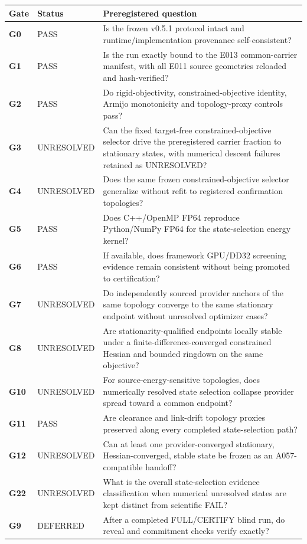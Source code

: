 \documentclass[10pt,a4paper]{article}
\begin{document}
\begin{longtable}{p{13mm}p{24mm}p{119mm}}
\toprule Gate & Status & Preregistered question \\
\midrule\endhead
\textbf{G0} & PASS & Is the frozen v0.5.1 protocol intact and runtime/implementation provenance self-consistent?\\\hline
\textbf{G1} & PASS & Is the run exactly bound to the E013 common-carrier manifest, with all E011 source geometries reloaded and hash-verified?\\\hline
\textbf{G2} & PASS & Do rigid-objectivity, constrained-objective identity, Armijo monotonicity and topology-proxy controls pass?\\\hline
\textbf{G3} & UNRESOLVED & Can the fixed target-free constrained-objective selector drive the preregistered carrier fraction to stationary states, with numerical descent failures retained as UNRESOLVED?\\\hline
\textbf{G4} & UNRESOLVED & Does the same frozen constrained-objective selector generalize without refit to registered confirmation topologies?\\\hline
\textbf{G5} & PASS & Does C++/OpenMP FP64 reproduce Python/NumPy FP64 for the state-selection energy kernel?\\\hline
\textbf{G6} & PASS & If available, does framework GPU/DD32 screening evidence remain consistent without being promoted to certification?\\\hline
\textbf{G7} & UNRESOLVED & Do independently sourced provider anchors of the same topology converge to the same stationary endpoint without unresolved optimizer cases?\\\hline
\textbf{G8} & UNRESOLVED & Are stationarity-qualified endpoints locally stable under a finite-difference-converged constrained Hessian and bounded ringdown on the same objective?\\\hline
\textbf{G10} & UNRESOLVED & For source-energy-sensitive topologies, does numerically resolved state selection collapse provider spread toward a common endpoint?\\\hline
\textbf{G11} & PASS & Are clearance and link-drift topology proxies preserved along every completed state-selection path?\\\hline
\textbf{G12} & UNRESOLVED & Can at least one provider-converged stationary, Hessian-converged, stable state be frozen as an A057-compatible handoff?\\\hline
\textbf{G22} & UNRESOLVED & What is the overall state-selection evidence classification when numerical unresolved states are kept distinct from scientific FAIL?\\\hline
\textbf{G9} & DEFERRED & After a completed FULL/CERTIFY blind run, do reveal and commitment checks verify exactly?\\\hline
\bottomrule\end{longtable}
\end{document}
